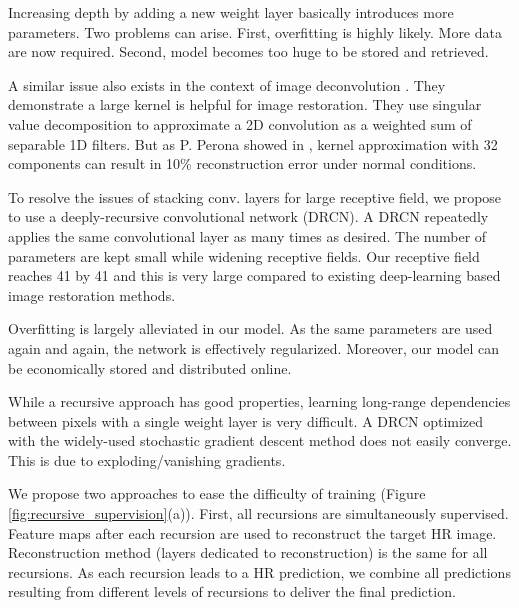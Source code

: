 \documentclass[10pt,twocolumn,letterpaper]{article}
\begin{document}
Increasing depth by adding a new weight layer basically introduces more parameters. Two problems can arise. First, overfitting is highly likely. More data are now required. Second, model becomes too huge to be stored and retrieved.

A similar issue also exists in the context of image deconvolution \cite{xu2014deep}. They demonstrate a large kernel is helpful for image restoration. They use singular value decomposition to approximate a 2D convolution as a weighted sum of separable 1D filters. But as P. Perona showed in \cite{perona1995deformable},  kernel approximation with 32 components can result in 10\% reconstruction error under normal conditions. 



To resolve the issues of stacking conv. layers for large receptive field, we propose to use a deeply-recursive convolutional network (DRCN). A DRCN repeatedly applies the same convolutional layer as many times as desired. The number of parameters are kept small while widening receptive fields. Our receptive field reaches 41 by 41 and this is very large compared to existing deep-learning based image restoration methods. 

Overfitting is largely alleviated in our model. As the same parameters are used again and again, the network is effectively regularized. Moreover, our model can be economically stored and distributed online.   

While a recursive approach has good properties, learning long-range dependencies between pixels with a single weight layer is very difficult. A DRCN optimized with the widely-used stochastic gradient descent method does not easily converge. This is due to exploding/vanishing gradients. 

We propose two approaches to ease the difficulty of training (Figure \ref{fig:recursive_supervision}(a)). First, all recursions are simultaneously supervised. Feature maps after each recursion are used to reconstruct the target HR image. Reconstruction method (layers dedicated to reconstruction) is the same for all recursions. As each recursion leads to a HR prediction, we combine all predictions resulting from different levels of recursions to deliver the final prediction.  
   
\end{document}
